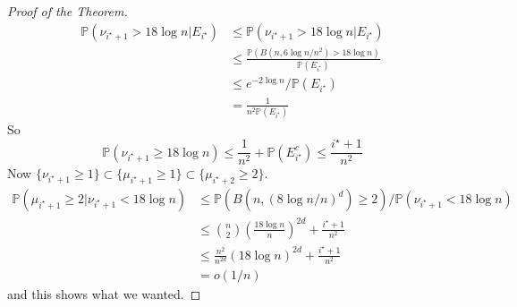 \begin{proof}[Proof of the Theorem]
    \begin{align*}
        \mathbb P(\nu_{i^\star+1}>18\log n|E_{i^\star})&\le\mathbb P(\nu_{i^\star+1}>18\log n|E_{i^\star})\\
        &\le\frac{\mathbb P(B(n,6\log n/n^2)>18\log n)}{\mathbb P(E_{i^\star})}\\
        &\le e^{-2\log n}/\mathbb P(E_{i^\star})\\
        &=\frac{1}{n^2\mathbb P(E_{i^\star})}
    \end{align*}
    So
    $$\mathbb P(\nu_{i^\star+1}\ge 18\log n)\le\frac{1}{n^2}+\mathbb P(E_{i^\star}^c)\le\frac{i^\star+1}{n^2}$$
    Now $\{\nu_{i^\star+1}\ge 1\}\subset\{\mu_{i^\star+1}\ge 1\}\subset\{\mu_{i^\star+2}\ge 2\}$.
    \begin{align*}
        \mathbb P(\mu_{i^\star+1}\ge 2|\nu_{i^\star+1}<18\log n)&\le\mathbb P(B(n,(8\log n/n)^d)\ge 2)/\mathbb P(\nu_{i^\star+1}<18\log n)\\
        &\le\binom{n}{2}\left( \frac{18\log n}{n} \right)^{2d}+\frac{i^\star+1}{n^2}\\
        &\le\frac{n^2}{n^{2d}}(18\log n)^{2d}+\frac{i^\star+1}{n^2}\\
        &=o(1/n)
    \end{align*}
    and this shows what we wanted.
\end{proof}
